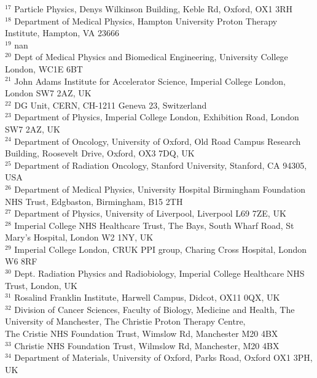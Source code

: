 {\begin{tabbing}
     $^{17}$ \> Particle Physics, Denys Wilkinson Building, Keble Rd, Oxford, OX1 3RH\\
     $^{18}$ \> Department of Medical Physics, Hampton University Proton Therapy Institute, Hampton, VA 23666\\
     $^{19}$ \> nan\\
     $^{20}$ \> Dept of Medical Physics and Biomedical Engineering, University College London, WC1E 6BT\\
     $^{21}$ \> John Adams Institute for Accelerator Science, Imperial College London, London SW7 2AZ, UK\\
     $^{22}$ \> DG Unit, CERN, CH-1211 Geneva 23, Switzerland\\
     $^{23}$ \> Department of Physics, Imperial College London, Exhibition Road, London SW7 2AZ, UK\\
     $^{24}$ \> Department of Oncology, University of Oxford, Old Road Campus Research Building, Roosevelt Drive, Oxford, OX3 7DQ, UK\\
     $^{25}$ \> Department of Radiation Oncology, Stanford University, Stanford, CA 94305, USA\\
     $^{26}$ \> Department of Medical Physics, University Hospital Birmingham Foundation NHS Trust, Edgbaston, Birmingham, B15 2TH\\
     $^{27}$ \> Department of Physics, University of Liverpool, Liverpool L69 7ZE, UK\\
     $^{28}$ \> Imperial College NHS Healthcare Trust, The Bays, South Wharf Road, St Mary's Hospital, London W2 1NY, UK\\
     $^{29}$ \> Imperial College London, CRUK PPI group, Charing Cross Hospital, London W6 8RF\\
     $^{30}$ \> Dept. Radiation Physics and Radiobiology, Imperial College Healthcare NHS Trust, London, UK\\
     $^{31}$ \> Rosalind Franklin Institute, Harwell Campus, Didcot, OX11 0QX, UK\\
     $^{32}$ \> Division of Cancer Sciences, Faculty of Biology, Medicine and Health, The University of Manchester, The Christie Proton Therapy Centre, \\ \> The Cristie NHS Foundation Trust, Wimslow Rd, Manchester M20 4BX\\
     $^{33}$ \> Christie NHS Foundation Trust, Wilmslow Rd, Manchester, M20 4BX\\
     $^{34}$ \> Department of Materials, University of Oxford, Parks Road, Oxford OX1 3PH, UK\\

\end{tabbing}}
